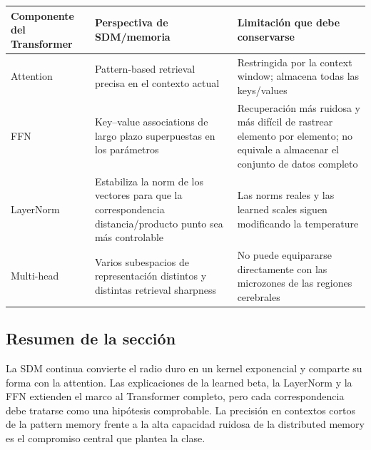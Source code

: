 
\begin{longtable}{@{}L{0.20\textwidth}L{0.31\textwidth}L{0.37\textwidth}@{}}
\toprule
Componente del Transformer & Perspectiva de SDM/memoria & Limitación que debe conservarse \\
\midrule
Attention & Pattern-based retrieval precisa en el contexto actual & Restringida por la context window; almacena todas las keys/values \\
FFN & Key--value associations de largo plazo superpuestas en los parámetros & Recuperación más ruidosa y más difícil de rastrear elemento por elemento; no equivale a almacenar el conjunto de datos completo \\
LayerNorm & Estabiliza la norm de los vectores para que la correspondencia distancia/producto punto sea más controlable & Las norms reales y las learned scales siguen modificando la temperature \\
Multi-head & Varios subespacios de representación distintos y distintas retrieval sharpness & No puede equipararse directamente con las microzones de las regiones cerebrales \\
\bottomrule
\end{longtable}


\subsection{Resumen de la sección}

La SDM continua convierte el radio duro en un kernel exponencial y comparte su forma con la attention. Las explicaciones de la learned beta, la LayerNorm y la FFN extienden el marco al Transformer completo, pero cada correspondencia debe tratarse como una hipótesis comprobable. La precisión en contextos cortos de la pattern memory frente a la alta capacidad ruidosa de la distributed memory es el compromiso central que plantea la clase.
